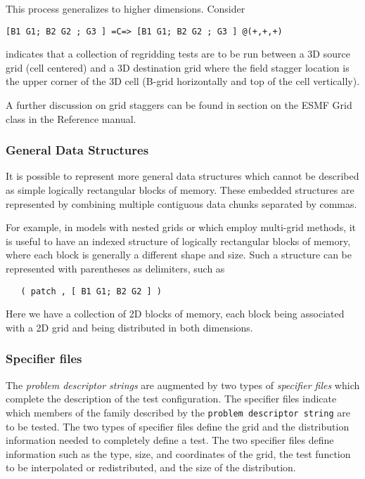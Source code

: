 This process generalizes to higher dimensions. Consider 
\begin{verbatim}
[B1 G1; B2 G2 ; G3 ] =C=> [B1 G1; B2 G2 ; G3 ] @(+,+,+)
\end{verbatim}
indicates that a collection of regridding tests are to be run between a 3D source grid (cell centered) and a 3D destination grid where the field stagger location is the upper corner of the 3D cell (B-grid horizontally and top of the cell vertically).

A further discussion on grid staggers can be found in section on the ESMF Grid class in the Reference manual.  

\subsubsection{General Data Structures}
It is possible to represent more general data structures which cannot be described as simple logically rectangular blocks of memory. These embedded structures are represented by combining multiple contiguous data chunks separated by commas. 

For example, in models with nested grids or which employ multi-grid methods, it is useful to have an indexed structure of  logically rectangular blocks of memory, where each block is generally a different shape and size. Such a structure can be represented with parentheses as delimiters, such as
\begin{center}
\begin{verbatim}
   ( patch , [ B1 G1; B2 G2 ] )
\end{verbatim}
\end{center}
Here we have a collection of 2D blocks of memory, each block being associated with a 2D grid and being distributed in both dimensions.

\subsubsection{Specifier files}
The \textit{problem descriptor strings} are augmented by two types of \textit{specifier files} which complete the description of the test configuration. The specifier files indicate which members of the family described by the \texttt{problem descriptor string} are to be tested. The two types of specifier files define the grid and the distribution information needed to completely define a test. The two specifier files define information such as the type, size, and coordinates of the grid, the test function to be interpolated or redistributed, and the size of the distribution.  

